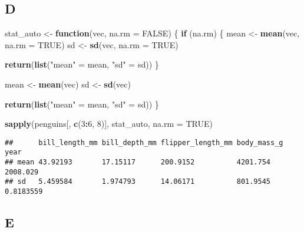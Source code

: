 \documentclass[
]{article}
\newenvironment{Shaded}{\begin{snugshade}}{\end{snugshade}}
\newcommand{\AttributeTok}[1]{\textcolor[rgb]{0.13,0.29,0.53}{#1}}
\newcommand{\ConstantTok}[1]{\textcolor[rgb]{0.56,0.35,0.01}{#1}}
\newcommand{\ControlFlowTok}[1]{\textcolor[rgb]{0.13,0.29,0.53}{\textbf{#1}}}
\newcommand{\DecValTok}[1]{\textcolor[rgb]{0.00,0.00,0.81}{#1}}
\newcommand{\FunctionTok}[1]{\textcolor[rgb]{0.13,0.29,0.53}{\textbf{#1}}}
\newcommand{\NormalTok}[1]{#1}
\newcommand{\OtherTok}[1]{\textcolor[rgb]{0.56,0.35,0.01}{#1}}
\newcommand{\SpecialCharTok}[1]{\textcolor[rgb]{0.81,0.36,0.00}{\textbf{#1}}}
\newcommand{\StringTok}[1]{\textcolor[rgb]{0.31,0.60,0.02}{#1}}
\begin{document}
\hypertarget{d}{%
\subsection{D}\label{d}}

\begin{Shaded}
\begin{Highlighting}[]
\NormalTok{stat\_auto }\OtherTok{\textless{}{-}} \ControlFlowTok{function}\NormalTok{(vec, }\AttributeTok{na.rm =} \ConstantTok{FALSE}\NormalTok{) \{}
  \ControlFlowTok{if}\NormalTok{ (na.rm) \{}
\NormalTok{    mean }\OtherTok{\textless{}{-}} \FunctionTok{mean}\NormalTok{(vec, }\AttributeTok{na.rm =} \ConstantTok{TRUE}\NormalTok{)}
\NormalTok{    sd }\OtherTok{\textless{}{-}} \FunctionTok{sd}\NormalTok{(vec, }\AttributeTok{na.rm =} \ConstantTok{TRUE}\NormalTok{)}

    \FunctionTok{return}\NormalTok{(}\FunctionTok{list}\NormalTok{(}\StringTok{"mean"} \OtherTok{=}\NormalTok{ mean, }\StringTok{"sd"} \OtherTok{=}\NormalTok{ sd))}
\NormalTok{  \}}

\NormalTok{  mean }\OtherTok{\textless{}{-}} \FunctionTok{mean}\NormalTok{(vec)}
\NormalTok{  sd }\OtherTok{\textless{}{-}} \FunctionTok{sd}\NormalTok{(vec)}

  \FunctionTok{return}\NormalTok{(}\FunctionTok{list}\NormalTok{(}\StringTok{"mean"} \OtherTok{=}\NormalTok{ mean, }\StringTok{"sd"} \OtherTok{=}\NormalTok{ sd))}
\NormalTok{\}}

\FunctionTok{sapply}\NormalTok{(penguins[, }\FunctionTok{c}\NormalTok{(}\DecValTok{3}\SpecialCharTok{:}\DecValTok{6}\NormalTok{, }\DecValTok{8}\NormalTok{)], stat\_auto, }\AttributeTok{na.rm =} \ConstantTok{TRUE}\NormalTok{)}
\end{Highlighting}
\end{Shaded}

\begin{verbatim}
##      bill_length_mm bill_depth_mm flipper_length_mm body_mass_g year     
## mean 43.92193       17.15117      200.9152          4201.754    2008.029 
## sd   5.459584       1.974793      14.06171          801.9545    0.8183559
\end{verbatim}

\hypertarget{e}{%
\subsection{E}\label{e}}
\end{document}
